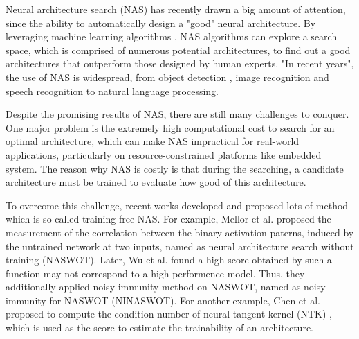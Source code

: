 \documentclass[sigconf]{acmart}
\begin{document}
    Neural architecture search (NAS) has recently drawn a big amount of 
    attention, since the ability to automatically design a "good" neural 
    architecture. By leveraging machine learning algorithms \cite{https://doi.org/10.48550/arxiv.1611.01578}, 
    NAS algorithms can explore a search space, which is comprised of numerous 
    potential architectures, to find out a good architectures that outperform 
    those designed by human experts. "In recent years", the use of NAS is 
    widespread, from object detection \cite{https://doi.org/10.48550/arxiv.2111.13336}, 
    image recognition \cite{https://doi.org/10.48550/arxiv.2006.04647} 
    and speech recognition \cite{https://doi.org/10.48550/arxiv.2011.05649} 
    \cite{mehrotra2021nasbenchasr} to natural language 
    processing. \cite{jiang-etal-2019-improved} 
    \cite{https://doi.org/10.48550/arxiv.2006.07116} 
    \cite{https://doi.org/10.48550/arxiv.2005.14187}

    Despite the promising results of NAS, there are still many challenges 
    to conquer. One major problem is the extremely high computational 
    cost to search for an optimal architecture, which can make NAS impractical 
    for real-world applications, particularly on resource-constrained 
    platforms like embedded system. The reason why NAS is costly is that 
    during the searching, a candidate architecture must be trained to 
    evaluate how good of this architecture.

    To overcome this challenge, recent works developed and proposed lots 
    of method which is so called training-free NAS. 
    For example, Mellor et al. \cite{https://doi.org/10.48550/arxiv.2006.04647} proposed the 
    measurement of the correlation between the binary activation paterns, 
    induced by the untrained network at two inputs, named as neural architecture 
    search without training (NASWOT). 
    Later, Wu et al. \cite{10.1145/3491396.3506510} found a high score 
    obtained by such a function may not correspond to a high-performence 
    model. Thus, they additionally applied noisy immunity method on NASWOT, 
    named as noisy immunity for NASWOT (NINASWOT).
    For another example, Chen et al. proposed to compute the condition 
    number of neural tangent kernel (NTK) \cite{https://doi.org/10.48550/arxiv.2102.11535} 
    \cite{https://doi.org/10.48550/arxiv.2203.09137} \cite{https://doi.org/10.48550/arxiv.2109.00817}, 
    which is used as the score to estimate the trainability of an architecture.
\end{document}
